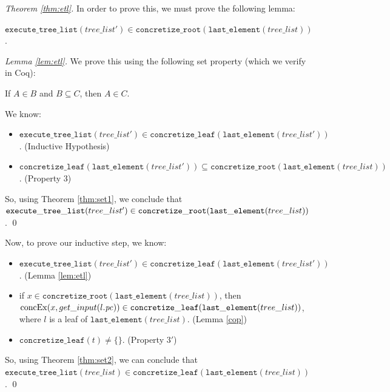 \begin{proof}[Theorem \ref{thm:etl}]
In order to prove this, we must prove the following lemma:
\begin{lemma} 
\label{lem:etl}
$\mathtt{execute\_tree\_list} (tree\_list') \in \mathtt{concretize\_root} (\mathtt{last\_element} (tree\_list))$.
\end{lemma}
\begin{proof}[Lemma \ref{lem:etl}]
We prove this using the following set property (which we verify in Coq):

\begin{theorem} \label{thm:set1}
If $A \in B$ and $B \subseteq C$, then $A \in C$.
\end{theorem}

We know:
\begin{itemize}
\item$ \mathtt{execute\_tree\_list}(tree\_list') \in
        \mathtt{concretize\_leaf} (\mathtt{last\_element}(tree\_list')) $. (Inductive Hypothesis)
\item 
$\mathtt{concretize\_leaf} (\mathtt{last\_element}(tree\_list')) \subseteq \mathtt{concretize\_root} (\mathtt{last\_element} (tree\_list))$. (Property $3$)
 \end{itemize}
 
 So, using Theorem \ref{thm:set1}, we conclude that $\mathtt{execute\_tree\_list} (tree\_list') \\ 
 \in 
 \mathtt{concretize\_root} (\mathtt{last\_element} (tree\_list))$. \qed
\end{proof}

Now, to prove our inductive step, we know:
\begin{itemize}
\item $\mathtt{execute\_tree\_list} (tree\_list') \in \mathtt{concretize\_leaf} (\mathtt{last\_element}(tree\_list'))$. (Lemma \ref{lem:etl})
\item if $x \in \mathtt{concretize\_root}(\mathtt{last\_element}(tree\_list))$, then \\
  $\mathrm{concEx}(x, get\_input (l.\mathit{pc})) \in \mathtt{concretize\_leaf}(\mathtt{last\_element}(tree\_list))$,
where $l$ is a leaf of $\mathtt{last\_element}(tree\_list)$. (Lemma \ref{cop})
\item $\mathtt{concretize\_leaf}(t) \neq \{\} $. (Property $3'$)
\end{itemize}

So, using Theorem \ref{thm:set2}, we can conclude that \\
$\mathtt{execute\_tree\_list} (tree\_list) \in \mathtt{concretize\_leaf} (\mathtt{last\_element}(tree\_list))$. \qed
\end{proof}

